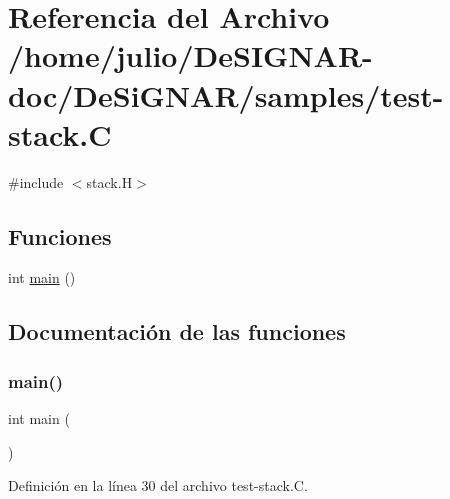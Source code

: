 \hypertarget{test-stack_8_c}{}\section{Referencia del Archivo /home/julio/\+De\+S\+I\+G\+N\+A\+R-\/doc/\+De\+Si\+G\+N\+A\+R/samples/test-\/stack.C}
\label{test-stack_8_c}
{\ttfamily \#include $<$stack.\+H$>$}\newline
\subsection*{Funciones}
\begin{DoxyCompactItemize}
\item 
int \hyperlink{test-stack_8_c_ae66f6b31b5ad750f1fe042a706a4e3d4}{main} ()
\end{DoxyCompactItemize}


\subsection{Documentación de las funciones}
\mbox{\label{test-stack_8_c_ae66f6b31b5ad750f1fe042a706a4e3d4}} 
\subsubsection{\texorpdfstring{main()}{main()}}
{\footnotesize\ttfamily int main (\begin{DoxyParamCaption}{ }\end{DoxyParamCaption})}



Definición en la línea 30 del archivo test-\/stack.\+C.

